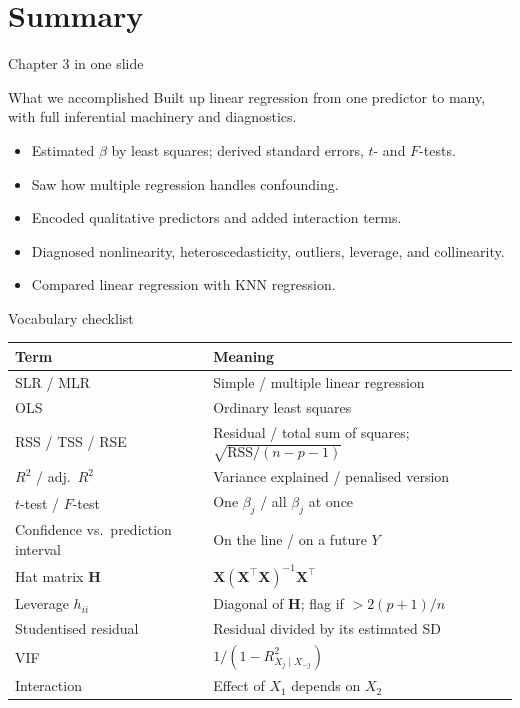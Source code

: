 \documentclass[aspectratio=169,11pt]{beamer}
\begin{document}
\section{Summary}

\begin{frame}{Chapter 3 in one slide}
  \begin{block}{What we accomplished}
    Built up linear regression from one predictor to many, with full
    inferential machinery and diagnostics.
  \end{block}
  \begin{itemize}
    \item Estimated $\beta$ by least squares; derived standard errors,
          $t$- and $F$-tests.
    \item Saw how multiple regression handles confounding.
    \item Encoded qualitative predictors and added interaction terms.
    \item Diagnosed nonlinearity, heteroscedasticity, outliers,
          leverage, and collinearity.
    \item Compared linear regression with KNN regression.
  \end{itemize}
\end{frame}

\begin{frame}{Vocabulary checklist}
  \footnotesize
  \begin{tabular}{ll}
    \toprule
    \textbf{Term} & \textbf{Meaning} \\
    \midrule
    SLR / MLR & Simple / multiple linear regression \\
    OLS & Ordinary least squares \\
    RSS / TSS / RSE & Residual / total sum of squares; $\sqrt{\mathrm{RSS}/(n-p-1)}$ \\
    $R^2$ / adj.\ $R^2$ & Variance explained / penalised version \\
    $t$-test / $F$-test & One $\beta_j$ / all $\beta_j$ at once \\
    Confidence vs.\ prediction interval & On the line / on a future $Y$ \\
    Hat matrix $\mathbf{H}$ & $\mathbf{X}(\mathbf{X}^\top\mathbf{X})^{-1}\mathbf{X}^\top$ \\
    Leverage $h_{ii}$ & Diagonal of $\mathbf{H}$; flag if $> 2(p+1)/n$ \\
    Studentised residual & Residual divided by its estimated SD \\
    VIF & $1/(1 - R^2_{X_j \mid X_{-j}})$ \\
    Interaction & Effect of $X_1$ depends on $X_2$ \\
    \bottomrule
  \end{tabular}
\end{frame}
\end{document}
